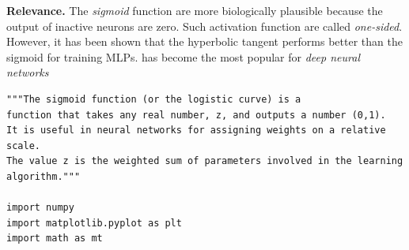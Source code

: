 \documentclass{beamer}
\begin{document}
\begin{frame}

\noindent\textbf{Relevance.}
The \emph{sigmoid} function are more biologically plausible because the
output of inactive neurons are zero. Such activation function are
called \emph{one-sided}. However, it has been shown that the hyperbolic
tangent performs better than the sigmoid for training MLPs.  has
become the most popular for \emph{deep neural networks}









































































\begin{verbatim}
"""The sigmoid function (or the logistic curve) is a 
function that takes any real number, z, and outputs a number (0,1).
It is useful in neural networks for assigning weights on a relative scale.
The value z is the weighted sum of parameters involved in the learning algorithm."""

import numpy
import matplotlib.pyplot as plt
import math as mt


\end{verbatim}
\end{frame}
\end{document}
